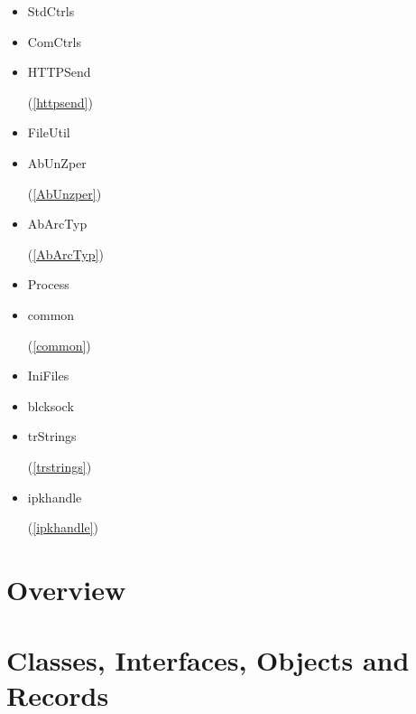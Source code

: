\documentclass{report}
\newif\ifpdf
\begin{document}
\begin{itemize}
\item \begin{ttfamily}StdCtrls\end{ttfamily}\item \begin{ttfamily}ComCtrls\end{ttfamily}\item \begin{ttfamily}HTTPSend\end{ttfamily}(\ref{httpsend})\item \begin{ttfamily}FileUtil\end{ttfamily}\item \begin{ttfamily}AbUnZper\end{ttfamily}(\ref{AbUnzper})\item \begin{ttfamily}AbArcTyp\end{ttfamily}(\ref{AbArcTyp})\item \begin{ttfamily}Process\end{ttfamily}\item \begin{ttfamily}common\end{ttfamily}(\ref{common})\item \begin{ttfamily}IniFiles\end{ttfamily}\item \begin{ttfamily}blcksock\end{ttfamily}\item \begin{ttfamily}trStrings\end{ttfamily}(\ref{trstrings})\item \begin{ttfamily}ipkhandle\end{ttfamily}(\ref{ipkhandle})\end{itemize}
\section{Overview}
\begin{description}
\item[\texttt{\begin{ttfamily}TUExecFm\end{ttfamily} Class}]
\end{description}
\section{Classes, Interfaces, Objects and Records}
\ifpdf
\end{document}
